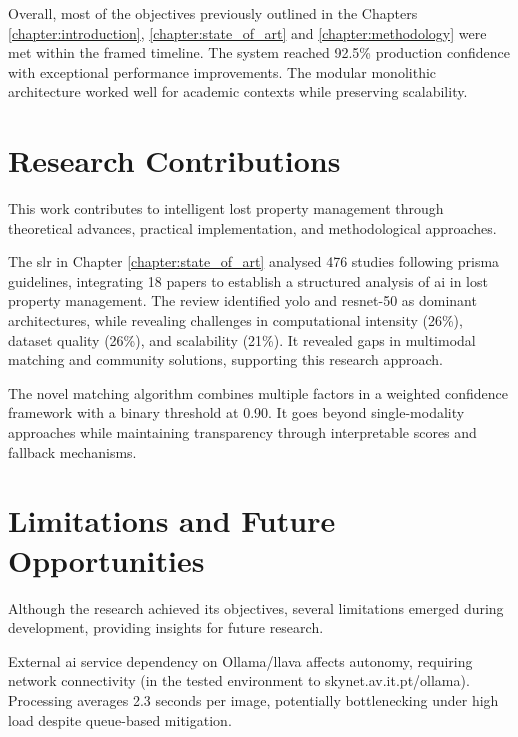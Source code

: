 Overall, most of the objectives previously outlined in the Chapters \ref{chapter:introduction}, \ref{chapter:state_of_art} and \ref{chapter:methodology} were met within the framed timeline. The system reached 92.5\% production confidence with exceptional performance improvements. The modular monolithic architecture worked well for academic contexts while preserving scalability.


\section{Research Contributions} \label{section:research_contributions}

This work contributes to intelligent lost property management through theoretical advances, practical implementation, and methodological approaches.

The \ac{slr} in Chapter \ref{chapter:state_of_art} analysed 476 studies following \ac{prisma} guidelines, integrating 18 papers to establish a structured analysis of \ac{ai} in lost property management. The review identified \ac{yolo} and \ac{resnet}-50 as dominant architectures, while revealing challenges in computational intensity (26\%), dataset quality (26\%), and scalability (21\%). It revealed gaps in multimodal matching and community solutions, supporting this research approach.

The novel matching algorithm combines multiple factors in a weighted confidence framework with a binary threshold at 0.90. It goes beyond single-modality approaches while maintaining transparency through interpretable scores and fallback mechanisms.


\section{Limitations and Future Opportunities} \label{section:limitations_opportunities}

Although the research achieved its objectives, several limitations emerged during development, providing insights for future research.

External \ac{ai} service dependency on Ollama/\ac{llava} affects autonomy, requiring network connectivity (in the tested environment to skynet.av.it.pt/ollama). Processing averages 2.3 seconds per image, potentially bottlenecking under high load despite queue-based mitigation.

